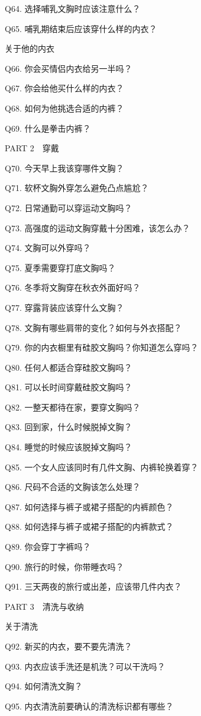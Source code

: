 \documentclass[12pt,UTF8]{ctexbook}
\begin{document}
Q64. 选择哺乳文胸时应该注意什么？

Q65. 哺乳期结束后应该穿什么样的内衣？

关于他的内衣

Q66. 你会买情侣内衣给另一半吗？

Q67. 你会给他买什么样的内衣？

Q68. 如何为他挑选合适的内裤？

Q69. 什么是拳击内裤？

PART 2　穿戴

Q70. 今天早上我该穿哪件文胸？

Q71. 软杯文胸外穿怎么避免凸点尴尬？

Q72. 日常通勤可以穿运动文胸吗？

Q73. 高强度的运动文胸穿戴十分困难，该怎么办？

Q74. 文胸可以外穿吗？

Q75. 夏季需要穿打底文胸吗？

Q76. 冬季将文胸穿在秋衣外面好吗？

Q77. 穿露背装应该穿什么文胸？

Q78. 文胸有哪些肩带的变化？如何与外衣搭配？

Q79. 你的内衣橱里有硅胶文胸吗？你知道怎么穿吗？

Q80. 任何人都适合穿硅胶文胸吗？

Q81. 可以长时间穿戴硅胶文胸吗？

Q82. 一整天都待在家，要穿文胸吗？

Q83. 回到家，什么时候脱掉文胸？

Q84. 睡觉的时候应该脱掉文胸吗？

Q85. 一个女人应该同时有几件文胸、内裤轮换着穿？

Q86. 尺码不合适的文胸该怎么处理？

Q87. 如何选择与裤子或裙子搭配的内裤颜色？

Q88. 如何选择与裤子或裙子搭配的内裤款式？

Q89. 你会穿丁字裤吗？

Q90. 旅行的时候，你带睡衣吗？

Q91. 三天两夜的旅行或出差，应该带几件内衣？

PART 3　清洗与收纳

关于清洗

Q92. 新买的内衣，要不要先清洗？

Q93. 内衣应该手洗还是机洗？可以干洗吗？

Q94. 如何清洗文胸？

Q95. 内衣清洗前要确认的清洗标识都有哪些？
\end{document}
